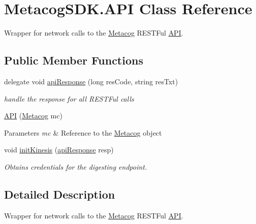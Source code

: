 \hypertarget{classMetacogSDK_1_1API}{}\section{Metacog\+S\+D\+K.\+A\+PI Class Reference}
\label{classMetacogSDK_1_1API}


Wrapper for network calls to the \hyperlink{classMetacogSDK_1_1Metacog}{Metacog} R\+E\+S\+T\+Ful \hyperlink{classMetacogSDK_1_1API}{A\+PI}.  


\subsection*{Public Member Functions}
\begin{DoxyCompactItemize}
\item 
delegate void \hyperlink{classMetacogSDK_1_1API_a32f228252de73a7e47dffd674c9c7184}{api\+Response} (long res\+Code, string res\+Txt)
\begin{DoxyCompactList}\small\item\em handle the response for all R\+E\+S\+T\+Ful calls \end{DoxyCompactList}\item 
\hyperlink{classMetacogSDK_1_1API_a4de3d5a351dc955c280febc2aed43c02}{A\+PI} (\hyperlink{classMetacogSDK_1_1Metacog}{Metacog} mc)\hypertarget{classMetacogSDK_1_1API_a4de3d5a351dc955c280febc2aed43c02}{}\label{classMetacogSDK_1_1API_a4de3d5a351dc955c280febc2aed43c02}

\begin{DoxyCompactList}\small\item\em 
\begin{DoxyParams}{Parameters}
{\em mc} & Reference to the \hyperlink{classMetacogSDK_1_1Metacog}{Metacog} object\\
\hline
\end{DoxyParams}
\end{DoxyCompactList}\item 
void \hyperlink{classMetacogSDK_1_1API_a8ca2987250fe76524ec9e959676dc237}{init\+Kinesis} (\hyperlink{classMetacogSDK_1_1API_a32f228252de73a7e47dffd674c9c7184}{api\+Response} resp)
\begin{DoxyCompactList}\small\item\em Obtains credentials for the digesting endpoint. \end{DoxyCompactList}\end{DoxyCompactItemize}


\subsection{Detailed Description}
Wrapper for network calls to the \hyperlink{classMetacogSDK_1_1Metacog}{Metacog} R\+E\+S\+T\+Ful \hyperlink{classMetacogSDK_1_1API}{A\+PI}. 

